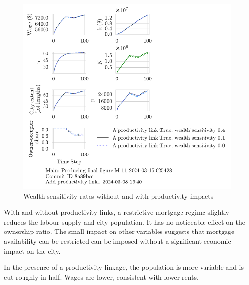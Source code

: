 \begin{figure}[h!tb]
    \includegraphics[scale=.75, trim={0 1.4cm 4.75cm 0},clip]{fig/With-productivity_link-wealth_sensitivity-025428.pdf} 
    \caption{Wealth sensitivity rates without and with productivity impacts}
    \label{fig:Productivity_link_W-WO-wealth}
\end{figure}
With and without productivity links, a restrictive mortgage regime slightly reduces the labour supply and city population. It has no noticeable effect on the ownership ratio. The small impact on other variables suggests that mortgage availability can be restricted can be imposed without a significant economic impact on the city. 

In the presence of a productivity linkage, the population is  more variable and is cut roughly in half. Wages are lower, consistent with lower rents.

\newpage
